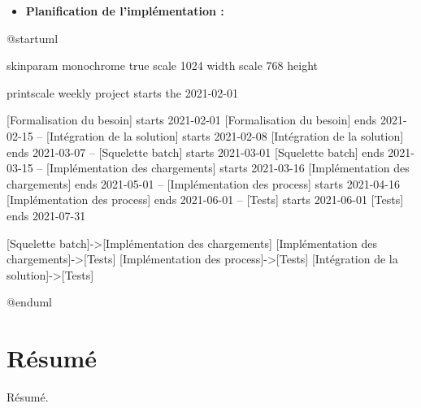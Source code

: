 \documentclass[a4paper, 12pt]{report}
\begin{document}
\begin{itemize}
  \item \textbf{Planification de l'implémentation :}\\
\end{itemize}

\begin{center}
  \begin{plantuml}
    @startuml

    skinparam monochrome true
    scale 1024 width
    scale 768 height

    printscale weekly
    project starts the 2021-02-01

    [Formalisation du besoin] starts 2021-02-01
    [Formalisation du besoin] ends 2021-02-15
    --
    [Intégration de la solution] starts 2021-02-08
    [Intégration de la solution] ends 2021-03-07
    --
    [Squelette batch] starts 2021-03-01
    [Squelette batch] ends 2021-03-15
    --
    [Implémentation des chargements] starts 2021-03-16
    [Implémentation des chargements] ends 2021-05-01
    --
    [Implémentation des process] starts 2021-04-16
    [Implémentation des process] ends 2021-06-01
    --
    [Tests] starts 2021-06-01
    [Tests] ends 2021-07-31

    [Squelette batch]->[Implémentation des chargements]
    [Implémentation des chargements]->[Tests]
    [Implémentation des process]->[Tests]
    [Intégration de la solution]->[Tests]

    @enduml
  \end{plantuml}
\end{center}


\tableofcontents
\thispagestyle{empty}


\chapter*{Résumé}
\thispagestyle{empty}

Résumé.
\end{document}
